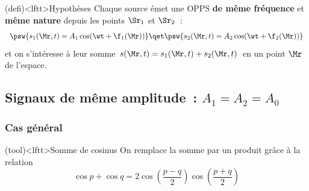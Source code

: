 \documentclass[../../main/main.tex]{subfiles}
\begin{document}
\begin{tcb}[sidebyside, righthand ratio=.25](defi)<lftt>{Hypothèses}
	Chaque source émet une OPPS
	\textbf{de même fréquence} et \textbf{même nature} depuis les points
	$\Sr_1$ et $\Sr_2$~:
	\[
		\psw{s_1(\Mr,t) = A_1\cos(\wt+\f_1(\Mr))}
		\qet
		\psw{s_2(\Mr,t) = A_2\cos(\wt+\f_2(\Mr))}
	\]
	et on s'intéresse à leur somme $s(\Mr, t) = s_1(\Mr, t) + s_2(\Mr, t)$ en
	un point $\Mr$ de l'espace.
	\tcblower
	\begin{center}
		\vspace{-15pt}
		\captionsetup{justification=centering}
	\end{center}
\end{tcb}

\subsection{Signaux de même amplitude~: $A_1 = A_2 = A_0$}
\subsubsection{Cas général}

\begin{tcb}(tool)<lftt>{Somme de cosinus}
	On remplace la somme par un produit grâce à la relation
	\[
		\cos p + \cos q =
		2\cos( \frac{p-q}{2} )\cos ( \frac{p+q}{2} )
	\]
\end{tcb}
\end{document}
